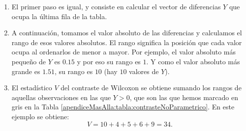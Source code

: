 \begin{ejemplo}
\begin{enumerate}
  \item El primer paso es igual, y consiste en calcular el vector de diferencias $Y$ que ocupa la última fila de la tabla.

  \item A continuación, tomamos el valor absoluto de las diferencias y calculamos el {\sf rango} de esos valores absolutos. El rango significa la posición que cada valor ocupa al ordenarlos de menor a mayor. Por ejemplo, el valor absoluto más pequeño de $Y$ es $0.15$ y por eso su rango es $1$. Y como el valor absoluto más grande es $1.51$, su rango es $10$ (hay $10$ valores de $Y$).

  \item El estadístico $V$ del contraste de Wilcoxon se obtiene sumando los rangos de aquellas observaciones en las que $Y>0$, que son las que hemos marcado en gris en la Tabla \ref{apendiceMasAlla:tabla:contrasteNoParametrico}. En este ejemplo se obtiene:
      \[V = 10 + 4 + 5+ 6 + 9 = 34.\]


\end{enumerate}
\end{ejemplo}

